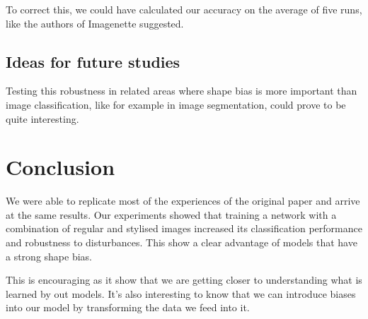 \documentclass{article}
\begin{document}
\noindent
To correct this, we could have calculated our accuracy on the average of five runs, like the authors of Imagenette \cite{fastai2019}
suggested.

\subsection{Ideas for future studies}

Testing this robustness in related areas where shape bias is more important than image classification, like for example in image segmentation, could prove to be quite interesting.

\section{Conclusion}

We were able to replicate most of the experiences of the original paper and arrive at the same results.
Our experiments showed that training a network with a combination of regular and stylised images increased its classification performance and robustness to disturbances.
This show a clear advantage of models that have a strong shape bias. \medskip \par 

\noindent
This is encouraging as it show that we are getting closer to understanding what is learned by out models. It's also interesting to know that we can introduce biases into our model by transforming the data we feed into it.


\newpage
\appendix



\end{document}
